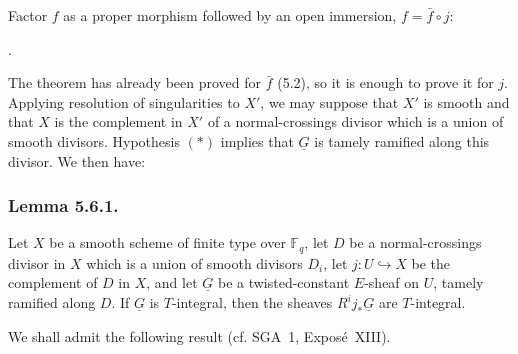 Factor $f$ as a proper morphism followed by an open immersion,
$f=\bar f\circ j$:
\begin{center}
\qquad .
\end{center}
The theorem has already been proved for $\bar f$ (5.2), so it is enough to
prove it for $j$.  Applying resolution of singularities to $X'$, we may
suppose that $X'$ is smooth and that $X$ is the complement in $X'$ of a
normal-crossings divisor which is a union of smooth divisors.  Hypothesis
$(*)$ implies that $\underline G$ is tamely ramified along this divisor.
We then have:

\subsubsection*{Lemma 5.6.1.}
Let $X$ be a smooth scheme of finite type over $\mathbb F_q$, let $D$ be a
normal-crossings divisor in $X$ which is a union of smooth divisors $D_i$,
let $j:U\hookrightarrow X$ be the complement of $D$ in $X$, and let
$\underline G$ be a twisted-constant $E$-sheaf on $U$, tamely ramified
along $D$.  If $\underline G$ is $T$-integral, then the sheaves
$R^ij_*\underline G$ are $T$-integral.

We shall admit the following result (cf. SGA~1, Expos\'e~XIII).

